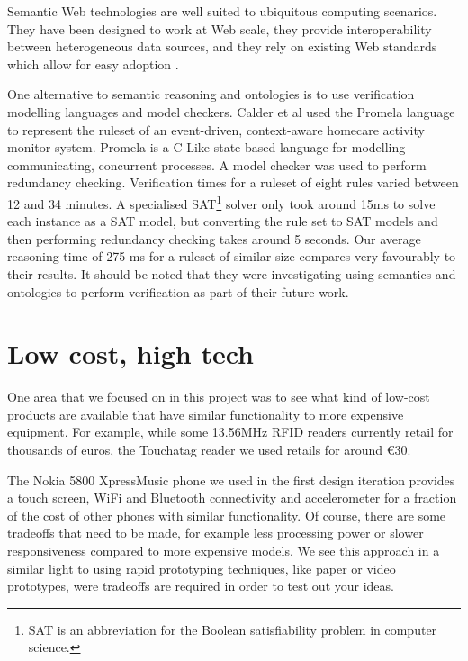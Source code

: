 Semantic Web technologies are well suited to ubiquitous computing scenarios. They have been designed to work at Web scale, they provide interoperability between heterogeneous data sources, and they rely on existing Web standards which allow for easy adoption \cite{Sabou2010}.

One alternative to semantic reasoning and ontologies is to use verification modelling languages and model checkers. Calder et al \cite{Calder2009} used the Promela language to represent the ruleset of an event-driven, context-aware homecare activity monitor system. Promela is a C-Like state-based language for modelling communicating, concurrent processes. A model checker was used to perform redundancy checking. Verification times for a ruleset of eight rules varied between 12 and 34 minutes. A specialised SAT\footnote{SAT is an abbreviation for the Boolean satisfiability problem in computer science.} solver only took around 15ms to solve each instance as a SAT model, but converting the rule set to SAT models and then performing redundancy checking takes around 5 seconds.
 Our average reasoning time of 275 ms for a ruleset of similar size compares very favourably to their results. It should be noted that they were investigating using semantics and ontologies to perform verification as part of their future work.




\section{Low cost, high tech}

One area that we focused on in this project was to see what kind of low-cost products are available that have similar functionality to more expensive equipment. For example, while some 13.56MHz \ac{RFID} readers currently retail for thousands of euros, the Touchatag reader we used retails for around \euro 30.  

The Nokia 5800 XpressMusic phone we used in the first design iteration provides a touch screen, WiFi and Bluetooth connectivity and accelerometer for a fraction of the cost of other phones with similar functionality. Of course, there are some tradeoffs that need to be made, for example less processing power or slower responsiveness compared to more expensive models. We see this approach in a similar light to using rapid prototyping techniques, like paper or video prototypes, were tradeoffs are required in order to test out your ideas.

